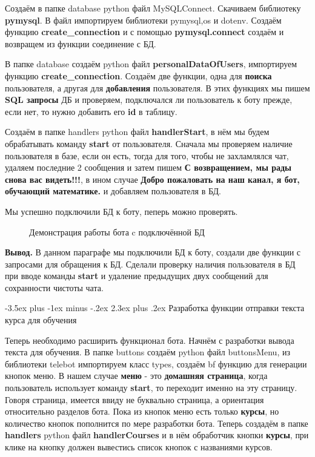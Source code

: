 \documentclass[12pt, oldlfont, amsfonts]{report}
\makeatletter
\renewcommand{\section}{\@startsection{section}{1}{0pt}%
                                {-3.5ex plus -1ex minus -.2ex}%
                                {2.3ex plus .2ex}%
{\centering\hyphenpenalty=10000\normalfont\Large\bfseries}}
\makeatother
\begin{document}
Создаём в папке database python файл MySQLConnect. Скачиваем библиотеку {\bf pymysql}. В файл импортируем библиотеки pymysql,os и dotenv. Создаём функцию {\bf create\_connection} и с помощью {\bf pymysql.connect} создаём и возвращем из функции соединение с БД. 

В папке database создаём python файл {\bf personalDataOfUsers}, импортируем функцию {\bf create\_connection}. Создаём две функции, одна для {\bf поиска} пользователя, а другая для {\bf добавления} пользователя. В этих функциях мы пишем {\bf SQL запросы} ДБ и проверяем, подключался ли пользователь к боту прежде, если нет, то нужно добавить его {\bf id} в таблицу.

Создаём в папке handlers python файл {\bf handlerStart}, в нём мы будем обрабатывать команду {\bf start} от пользователя. Сначала мы проверяем наличие пользователя в базе, если он есть, тогда для того, чтобы не захламлялся чат, удаляем последние 2 сообщения и затем пишем {\bf С возвращением, мы рады снова вас видеть!!!}, в ином случае {\bf Добро пожаловать на наш канал, я бот, обучающий математике.}  и добавляем пользователя в БД.

Мы успешно подключили БД к боту, пеперь можно проверять.


\begin{figure}[h!]
\caption{Демонстрация работы бота c подключённой БД}

\end{figure}

{\bf Вывод.} В данном параграфе мы подключили БД к боту, создали две функции с запросами для обращения к БД. Сделали проверку наличия пользователя в БД при вводе команды {\bf start} и удаление предыдущих двух сообщений для сохранности чистоты чата.
 
\section{Разработка функции отправки текста курса для обучения}

Теперь необходимо расширить функционал бота. Начнём с разработки вывода текста для обучения. В папке buttons создаём python файл buttonsMenu, из библиотеки telebot импортируем класс types, создаём {bf функцию для генерации кнопок меню}. В нашем случае {\bf меню} - это {\bf домашняя страница}, когда пользователь использует команду {\bf start}, то переходит именно на эту страницу. Говоря страница, имеется ввиду не буквально страница, а ориентация относительно разделов бота. Пока из кнопок меню есть только {\bf курсы}, но количество кнопок пополнится по мере разработки бота. Теперь создадём в папке {\bf handlers} python файл {\bf handlerCourses} и в нём обработчик кнопки {\bf курсы}, при клике на кнопку должен вывестись список кнопок с названиями курсов.
\end{document}
